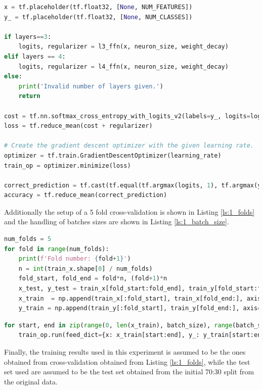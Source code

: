 \begin{lstlisting}[language=Python, caption= Definition of a 3 layer network, label=ls:1_loss]
x = tf.placeholder(tf.float32, [None, NUM_FEATURES])
y_ = tf.placeholder(tf.float32, [None, NUM_CLASSES])

if layers==3:
    logits, regularizer = l3_ffn(x, neuron_size, weight_decay)
elif layers == 4:
    logits, regularizer = l4_ffn(x, neuron_size, weight_decay)
else:
    print('Invalid number of layers given.')
    return

cost = tf.nn.softmax_cross_entropy_with_logits_v2(labels=y_, logits=logits)
loss = tf.reduce_mean(cost + regularizer)

# Create the gradient descent optimizer with the given learning rate.
optimizer = tf.train.GradientDescentOptimizer(learning_rate)
train_op = optimizer.minimize(loss)

correct_prediction = tf.cast(tf.equal(tf.argmax(logits, 1), tf.argmax(y_, 1)), tf.float32)
accuracy = tf.reduce_mean(correct_prediction)
\end{lstlisting}

Additionally the setup of a 5 fold cross-validation is shown in Listing \ref{ls:1_folds} and the handling of batches sizes are shown in Listing \ref{ls:1_batch_size}.

\begin{lstlisting}[language=Python, caption= 5 fold cross-validation, label=ls:1_folds]
num_folds = 5
for fold in range(num_folds):
    print(f'Fold number: {fold+1}')
    n = int(train_x.shape[0] / num_folds)
    fold_start, fold_end = fold*n, (fold+1)*n
    x_test, y_test = train_x[fold_start:fold_end], train_y[fold_start:fold_end]
    x_train  = np.append(train_x[:fold_start], train_x[fold_end:], axis=0)
    y_train = np.append(train_y[:fold_start], train_y[fold_end:], axis=0) 
\end{lstlisting}

\begin{lstlisting}[language=Python, caption= Batch size setup, label=ls:1_batch_size]
for start, end in zip(range(0, len(x_train), batch_size), range(batch_size, len(x_train), batch_size)):
    train_op.run(feed_dict={x: x_train[start:end], y_: y_train[start:end]})
\end{lstlisting}

Finally, the training results used in this experiment is assumed to be the ones obtained from cross-validation obtained from Listing \ref{ls:1_folds}, while the test set used are assumed to be the test set obtained from the initial 70:30 split from the original data.

